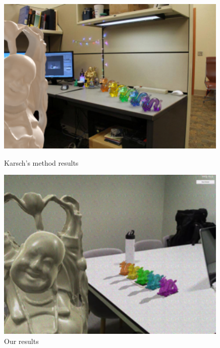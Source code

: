\begin{figure}[H]
    \centering
    \begin{minipage}{0.475\textwidth}
        \centering
        \includegraphics[width=0.99\textwidth]{Figures/budaDragonKarsch.png} %
        \caption{Karsch's method results}
    \end{minipage}\hfill
    \begin{minipage}{0.475\textwidth}
        \centering
        \includegraphics[width=0.99\textwidth]{Figures/budaDragon.png} %
        \caption{Our results}
    \end{minipage}
\end{figure}

